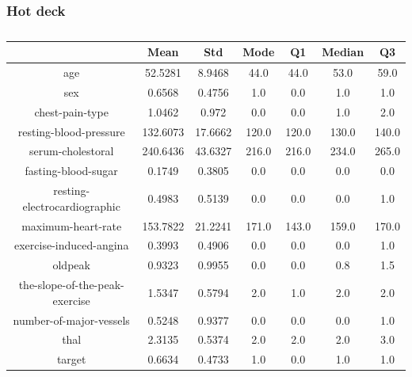 \documentclass{classrep}
\begin{document}
{{{            }

            \subsubsection{Hot deck}
            \label{results:45-percent:dot-deck} {
                \begin{table}[!htbp]
                    \centering
                    \begin{tabular}{|c|c|c|c|c|c|c|}
                        \hline
                        & Mean & Std & Mode & Q1 & Median & Q3 \\ \hline
                        age & 52.5281 & 8.9468 & 44.0 & 44.0 & 53.0 & 59.0 \\ \hline
                        sex & 0.6568 & 0.4756 & 1.0 & 0.0 & 1.0 & 1.0 \\ \hline
                        chest-pain-type & 1.0462 & 0.972 & 0.0 & 0.0 & 1.0 & 2.0 \\ \hline
                        resting-blood-pressure & 132.6073 & 17.6662 & 120.0 & 120.0 & 130.0 & 140.0 \\ \hline
                        serum-cholestoral & 240.6436 & 43.6327 & 216.0 & 216.0 & 234.0 & 265.0 \\ \hline
                        fasting-blood-sugar & 0.1749 & 0.3805 & 0.0 & 0.0 & 0.0 & 0.0 \\ \hline
                        resting-electrocardiographic & 0.4983 & 0.5139 & 0.0 & 0.0 & 0.0 & 1.0 \\ \hline
                        maximum-heart-rate & 153.7822 & 21.2241 & 171.0 & 143.0 & 159.0 & 170.0 \\ \hline
                        exercise-induced-angina & 0.3993 & 0.4906 & 0.0 & 0.0 & 0.0 & 1.0 \\ \hline
                        oldpeak & 0.9323 & 0.9955 & 0.0 & 0.0 & 0.8 & 1.5 \\ \hline
                        the-slope-of-the-peak-exercise & 1.5347 & 0.5794 & 2.0 & 1.0 & 2.0 & 2.0 \\ \hline
                        number-of-major-vessels & 0.5248 & 0.9377 & 0.0 & 0.0 & 0.0 & 1.0 \\ \hline
                        thal & 2.3135 & 0.5374 & 2.0 & 2.0 & 2.0 & 3.0 \\ \hline
                        target & 0.6634 & 0.4733 & 1.0 & 0.0 & 1.0 & 1.0 \\ \hline
                    \end{tabular}
                    \caption{}
                    \label{result_45_Hot-deck}
                \end{table}
                \FloatBarrier

}}}
\end{document}

